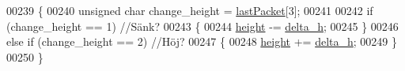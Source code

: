 \begin{DoxyCode}
00239 \{
00240     \textcolor{keywordtype}{unsigned} \textcolor{keywordtype}{char} change\_height = \hyperlink{styr_2styr_2main_8c_a17b197a501fde4cc8d5475b4adaab464}{lastPacket}[3];
00241     
00242     \textcolor{keywordflow}{if} (change\_height == 1) \textcolor{comment}{//Sänk?}
00243     \{
00244         \hyperlink{styr_2styr_2main_8c_a48083b65ac9a863566dc3e3fff09a5b4}{height} -= \hyperlink{styr_2styr_2main_8c_a9b9f29186e02953918ca4e891b0de1f7}{delta\_h};
00245     \}
00246     \textcolor{keywordflow}{else} \textcolor{keywordflow}{if} (change\_height == 2) \textcolor{comment}{//Höj?}
00247     \{
00248         \hyperlink{styr_2styr_2main_8c_a48083b65ac9a863566dc3e3fff09a5b4}{height} += \hyperlink{styr_2styr_2main_8c_a9b9f29186e02953918ca4e891b0de1f7}{delta\_h};
00249     \}
00250 \}
\end{DoxyCode}
